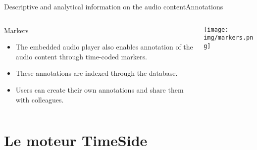 \documentclass[final, hyperref, table]{beamer}
\begin{document}
\begin{frame}{Descriptive and analytical information on the audio content}{Annotations}%
  \begin{columns}[T]
    \begin{column}{0.6\textwidth}
      \begin{block}{Markers}%
        \begin{itemize}
        \item The embedded audio player also enables annotation of the
          audio content through \alert{time-coded markers}.
        \item These annotations are \alert{indexed through the database}.

        \item Users can create their own annotations and \alert{share} them with colleagues.
   
        \end{itemize}

      \end{block}
    \end{column}

    \begin{column}{0.4\textwidth}
      \texttt{[image: img/markers.png]}
    \end{column}
  \end{columns}
\end{frame}

\section[TimeSide]{Le moteur TimeSide}\label{sec:TimeSide}
\end{document}
